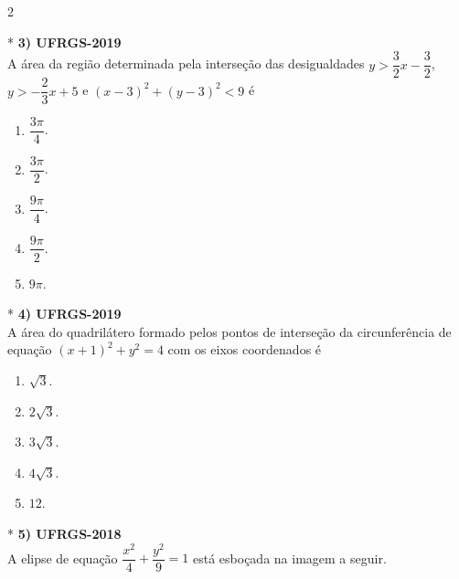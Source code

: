 \documentclass[11pt,a4paper]{article}
\begin{document}
\begin{paracol}{2}
    \switchcolumn[1]
    \vspace{10cm}

    \switchcolumn[0]*
    \textbf{3) UFRGS-2019} \\
    A área da região determinada pela interseção das desigualdades $y > \dfrac{3}{2}x - \dfrac{3}{2}$, $y > -\dfrac{2}{3}x + 5$ e $(x - 3)^2 + (y - 3)^2 < 9$ é

    \vspace{0.3cm}
    \begin{enumerate}[label=(\Alph*), itemsep=0.2cm]
        \item $\dfrac{3\pi}{4}$.
        \item $\dfrac{3\pi}{2}$.
        \item $\dfrac{9\pi}{4}$.
        \item $\dfrac{9\pi}{2}$.
        \item $9\pi$.
    \end{enumerate}
    \vspace{0.4cm}

    \switchcolumn[1]
    \vspace{5cm}

    \switchcolumn[0]*
    \textbf{4) UFRGS-2019} \\
    A área do quadrilátero formado pelos pontos de interseção da circunferência de equação $(x + 1)^2 + y^2 = 4$ com os eixos coordenados é

    \vspace{0.3cm}
    \begin{enumerate}[label=(\Alph*), itemsep=0.2cm]
        \item $\sqrt{3}$.
        \item $2\sqrt{3}$.
        \item $3\sqrt{3}$.
        \item $4\sqrt{3}$.
        \item $12$.
    \end{enumerate}
    \vspace{0.4cm}

    \switchcolumn[1]
    \vspace{5cm}

    \switchcolumn[0]*
    \textbf{5) UFRGS-2018} \\
    A elipse de equação $\dfrac{x^2}{4} + \dfrac{y^2}{9} = 1$ está esboçada na imagem a seguir.

    \vspace{0.3cm}
    \begin{center}
\end{center}
\end{paracol}
\end{document}
